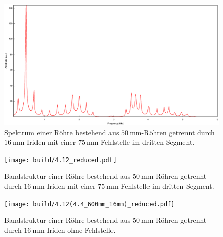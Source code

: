 \begin{figure}
\centering
\includegraphics[width=\linewidth-60pt,height=\textheight-60pt,keepaspectratio]{FP-V23data/4.12_seg3_75mm.eps}
\caption{Spektrum einer Röhre bestehend aus $\SI{50}{\milli\meter}$-Röhren getrennt durch $\SI{16}{\milli\meter}$-Iriden mit einer $\SI{75}{\milli\meter}$ Fehlstelle im dritten Segment.}
\label{fig:4.12_3}
\end{figure}

\begin{figure}
\centering
\texttt{[image: build/4.12\_reduced.pdf]}
\caption{Bandstruktur einer Röhre bestehend aus $\SI{50}{\milli\meter}$-Röhren getrennt durch $\SI{16}{\milli\meter}$-Iriden mit einer $\SI{75}{\milli\meter}$ Fehlstelle im dritten Segment.}
\label{fig:4_12_1}
\end{figure}

\begin{figure}
\centering
\texttt{[image: build/4.12(4.4\_600mm\_16mm)\_reduced.pdf]}
\caption{Bandstruktur einer Röhre bestehend aus $\SI{50}{\milli\meter}$-Röhren getrennt durch $\SI{16}{\milli\meter}$-Iriden ohne Fehlstelle.}
\label{fig:4_12_2}
\end{figure}

